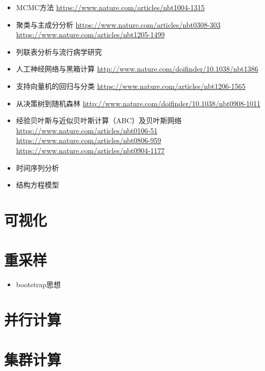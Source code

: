 \documentclass[]{tufte-book}
\providecommand{\tightlist}{%
  \setlength{\itemsep}{0pt}\setlength{\parskip}{0pt}}
\begin{document}
\begin{itemize}
\item
  MCMC方法 \url{https://www.nature.com/articles/nbt1004-1315}
\item
  聚类与主成分分析 \url{https://www.nature.com/articles/nbt0308-303} \url{https://www.nature.com/articles/nbt1205-1499}
\item
  列联表分析与流行病学研究
\item
  人工神经网络与黑箱计算 \url{http://www.nature.com/doifinder/10.1038/nbt1386}
\item
  支持向量机的回归与分类 \url{https://www.nature.com/articles/nbt1206-1565}
\item
  从决策树到随机森林 \url{http://www.nature.com/doifinder/10.1038/nbt0908-1011}
\item
  经验贝叶斯与近似贝叶斯计算（ABC）及贝叶斯网络 \url{https://www.nature.com/articles/nbt0106-51}
  \url{https://www.nature.com/articles/nbt0806-959}
  \url{https://www.nature.com/articles/nbt0904-1177}
\item
  时间序列分析
\item
  结构方程模型
\end{itemize}

\hypertarget{ux53efux89c6ux5316}{%
\section{可视化}\label{ux53efux89c6ux5316}}

\hypertarget{ux91cdux91c7ux6837}{%
\section{重采样}\label{ux91cdux91c7ux6837}}

\begin{itemize}
\tightlist
\item
  bootstrap思想
\end{itemize}

\hypertarget{ux5e76ux884cux8ba1ux7b97}{%
\section{并行计算}\label{ux5e76ux884cux8ba1ux7b97}}

\hypertarget{ux96c6ux7fa4ux8ba1ux7b97}{%
\section{集群计算}\label{ux96c6ux7fa4ux8ba1ux7b97}}
\end{document}
